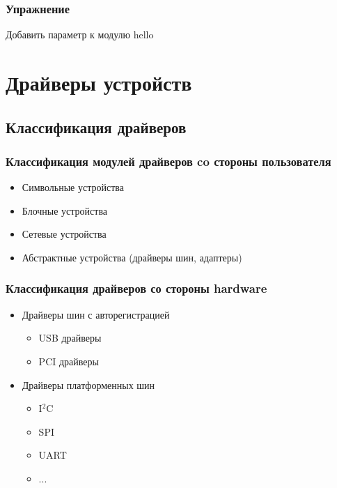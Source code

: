 \begin{frame}
  \frametitle{Упражнение}
  \begin{center}
    Добавить параметр к модулю hello
  \end{center}
\end{frame}


\section{Драйверы устройств}
\subsection{Классификация драйверов}
\begin{frame}
  \frametitle{Классификация модулей драйверов co стороны пользователя}
  \begin{itemize}
    \item Символьные устройства
    \item Блочные устройства
    \item Сетевые устройства
    \item Абстрактные устройства (драйверы шин, адаптеры)
  \end{itemize}
\end{frame}
\begin{frame}
  \frametitle{Классификация драйверов со стороны hardware}
  \begin{itemize}
    \item Драйверы шин с авторегистрацией
      \begin{itemize}
        \item USB драйверы
        \item PCI драйверы
      \end{itemize}
    \item Драйверы платформенных шин
      \begin{itemize}
        \item I$^2$C
        \item SPI
        \item UART
        \item ...
      \end{itemize}
  \end{itemize}
\end{frame}
